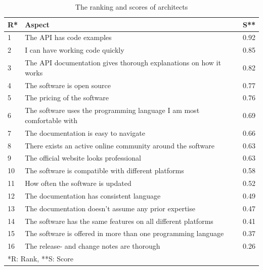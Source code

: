 \documentclass{article}
\begin{document}
\begin{table}[H]
\centering
\begin{tabularx}{\columnwidth}{l X r}

\textbf{R}* &  \textbf{Aspect}        & \textbf{S}** \\ \hline
1 &    The API has code examples                                             &         0.92             \\ \hline
2 &    I can have working code quickly                                       &         0.85             \\ \hline
3 &    The API documentation gives thorough explanations on how it works     &         0.82             \\ \hline
4 &    The software is open source                                           &         0.77             \\ \hline
5 &    The pricing of the software                                           &         0.76             \\ \hline
6 &    The software uses the programming language I am most comfortable with &         0.69             \\ \hline
7 &    The documentation is easy to navigate                                 &         0.66             \\ \hline
8 &    There exists an active online community around the software           &         0.63             \\ \hline
9 &    The official website looks professional                               &         0.63             \\ \hline
10 &    The software is compatible with different platforms                   &         0.58             \\ \hline
11 &    How often the software is updated                                     &         0.52             \\ \hline
12 &    The documentation has consistent language                             &         0.49             \\ \hline
13 &    The documentation doesn't assume any prior expertise                  &         0.47             \\ \hline
14 &    The software has the same features on all different platforms         &         0.41             \\ \hline
15 &    The software is offered in more than one programming language         &         0.37             \\ \hline
16 &    The release- and change notes are thorough                            &         0.26             \\ \hline \hline
\multicolumn{3}{l}{*R: Rank, **S: Score}
\end{tabularx}
\caption{The ranking and scores of architects}
\label{tab:arch}
\end{table}
\end{document}
